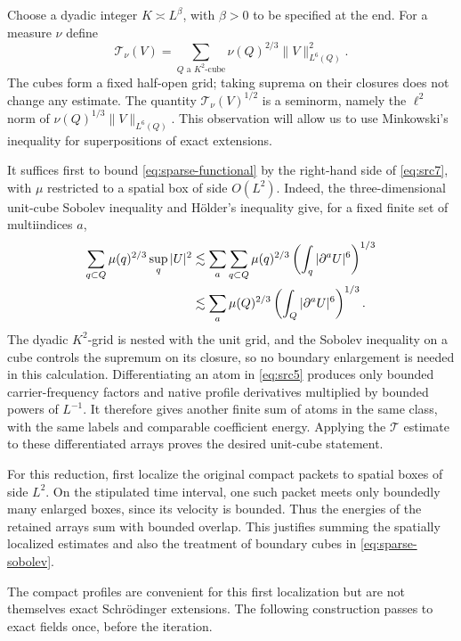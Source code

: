 Choose a dyadic integer $K\asymp L^\beta$, with $\beta>0$ to be specified
at the end.  For a measure $\nu$ define
\begin{equation}\label{eq:sparse-functional}
 \mathcal T_\nu(V)
   =\sum_{Q\text{ a }K^2\text{-cube}}
       \nu(Q)^{2/3}\|V\|_{L^6(Q)}^2.
\end{equation}
The cubes form a fixed half-open grid; taking suprema on their closures
does not change any estimate.  The quantity
$\mathcal T_\nu(V)^{1/2}$ is a seminorm, namely the $\ell^2$ norm of
$\nu(Q)^{1/3}\|V\|_{L^6(Q)}$.  This observation will allow us to use
Minkowski's inequality for superpositions of exact extensions.

It suffices first to bound \eqref{eq:sparse-functional} by the right-hand
side of \eqref{eq:src7}, with $\mu$ restricted to a spatial box of side
$O(L^2)$.  Indeed, the three-dimensional unit-cube Sobolev inequality and
H\"older's inequality give, for a fixed finite set of multiindices $a$,
\begin{align}
 \sum_{q\subset Q}\mu(q)^{2/3}\sup_q|U|^2
 &\lesssim
   \sum_a\sum_{q\subset Q}\mu(q)^{2/3}
       \left(\int_q|\partial^aU|^6\right)^{1/3}
       \notag\\
 &\lesssim
   \sum_a\mu(Q)^{2/3}
       \left(\int_Q|\partial^aU|^6\right)^{1/3}.
       \label{eq:sparse-sobolev}
\end{align}
The dyadic $K^2$-grid is nested with the unit grid, and the Sobolev
inequality on a cube controls the supremum on its closure, so no
boundary enlargement is needed in this calculation.  Differentiating an atom
in \eqref{eq:src5} produces only bounded carrier-frequency factors and
native profile derivatives multiplied by bounded powers of $L^{-1}$.
It therefore gives another finite sum of atoms in the same class, with
the same labels and comparable coefficient energy.  Applying the
$\mathcal T$ estimate to these differentiated arrays proves the desired
unit-cube statement.

For this reduction, first localize the original compact packets to
spatial boxes of side $L^2$.  On the stipulated time interval, one such
packet meets only boundedly many enlarged boxes, since its velocity is
bounded.  Thus the energies of the retained arrays sum with bounded
overlap.  This justifies summing the spatially localized estimates and
also the treatment of boundary cubes in \eqref{eq:sparse-sobolev}.

The compact profiles are convenient for this first localization but are
not themselves exact Schr\"odinger extensions.  The following construction
passes to exact fields once, before the iteration.

